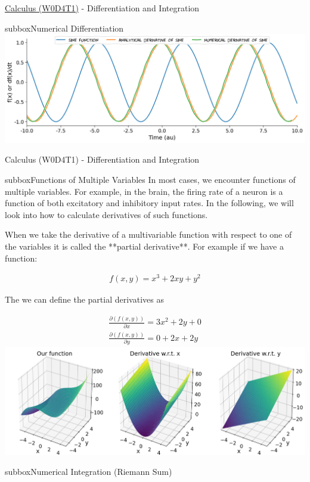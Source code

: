 \begin{textbox}{\href{https://compneuro.neuromatch.io/tutorials/W0D4_Calculus/student/W0D4_Tutorial1.html}{Calculus (W0D4T1)} - Differentiation and Integration}
\begin{subbox}{subbox}{Numerical Differentiation}
\centering
\includegraphics[scale=0.2]{Figures/PreCourse/CFigure2.png}
\end{subbox}
\end{textbox}
\begin{textbox}{Calculus (W0D4T1) - Differentiation and Integration}
\begin{subbox}{subbox}{Functions of Multiple Variables}
\scriptsize
In most cases, we encounter functions of multiple variables. For example, in the brain, the firing rate of a neuron is a function of both excitatory and inhibitory input rates. In the following, we will look into how to calculate derivatives of such functions.

When we take the derivative of a multivariable function with respect to one of the variables it is called the **partial derivative**. For example if we have a function:

\begin{align}
f(x,y) = x^3  +2xy+ y^2
\end{align}

The we can define the partial derivatives as

\begin{align}
\frac{\partial(f(x,y))}{\partial x} = 3x^2  +2y+ 0 \\
\frac{\partial(f(x,y))}{\partial y} = 0+ 2x+2y
\end{align}
\centering
\includegraphics[scale=0.2]{Figures/PreCourse/CFigure3.png}

\end{subbox}
\begin{subbox}{subbox}{Numerical Integration (Riemann Sum)}
\scriptsize


\end{subbox}
\end{textbox}

